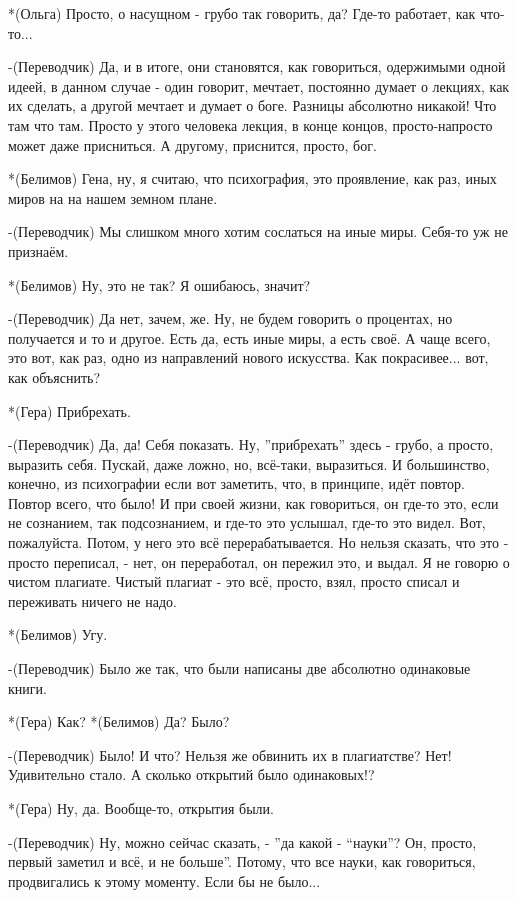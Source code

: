 *(Ольга)  Просто, о насущном - грубо так говорить, да? Где-то работает, как что-то... 

-(Переводчик) Да, и в итоге, они становятся, как говориться, одержимыми одной идеей, в данном случае - один говорит, мечтает, постоянно думает о лекциях, как их сделать, а другой  мечтает и думает о боге.  Разницы абсолютно никакой! Что там что там. Просто у этого человека лекция, в конце концов, просто-напросто может даже присниться. А другому,  приснится, просто, бог.

*(Белимов) Гена, ну, я считаю, что психография, это проявление, как раз, иных миров на на нашем земном плане. 

-(Переводчик) Мы слишком много хотим сослаться на иные миры. Себя-то уж не признаём.

*(Белимов) Ну, это не так? Я ошибаюсь, значит?

-(Переводчик) Да нет, зачем, же. Ну, не будем говорить о процентах, но получается и то и другое. Есть да, есть иные миры, а есть своё.  А чаще всего, это вот, как раз, одно из направлений нового искусства. Как покрасивее... вот, как объяснить?

*(Гера) Прибрехать.

-(Переводчик) Да, да! Себя показать. Ну, ”прибрехать” здесь - грубо, а просто, выразить себя. Пускай, даже ложно, но, всё-таки, выразиться. И большинство, конечно, из психографии если вот заметить, что, в принципе, идёт повтор. Повтор всего, что было! И при своей жизни, как говориться, он где-то это, если не сознанием, так подсознанием, и где-то это услышал, где-то это видел. Вот, пожалуйста. Потом, у него это всё  перерабатывается. Но нельзя сказать, что это -  просто переписал, - нет, он переработал, он пережил это, и выдал. Я не говорю о чистом плагиате. Чистый плагиат - это всё, просто, взял, просто списал и переживать ничего не надо. 

*(Белимов) Угу.

-(Переводчик) Было же так, что были написаны две абсолютно одинаковые книги.

*(Гера) Как?
*(Белимов) Да? Было?

-(Переводчик) Было! И что? Нельзя же обвинить их в плагиатстве? Нет! Удивительно стало. А сколько открытий было одинаковых!?

*(Гера) Ну, да. Вообще-то, открытия были.

-(Переводчик) Ну, можно сейчас сказать, - ”да какой - “науки”? Он, просто, первый заметил и всё, и не больше”. Потому, что все науки, как говориться, продвигались к этому моменту. Если бы не было... 

